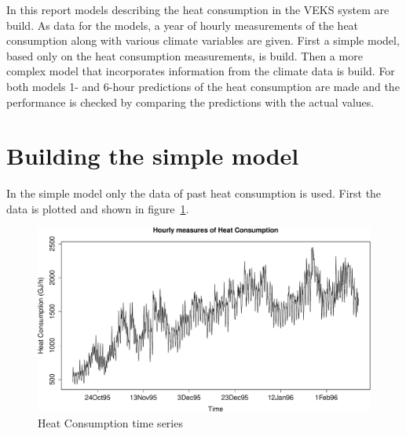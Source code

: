 \def\assignmenttitle{Modelling and Predicting the Heat Consumption}
\def\assignmentnumber{4}
\def\assignmentdate{17-11-2011}
\def\githuburl{\small\url{https://github.com/alphabits/dtu-fall-2011/tree/master/02417/assignment-4}}
\def\githuburlfoot{\footnotesize\url{https://github.com/alphabits/dtu-fall-2011/tree/master/02417/assignment-4}}

\newcommand\mseven{\seasonal{3,1,3}{0,1,1}{24}}
\newcommand\meight{\seasonal{2,1,2}{0,1,1}{24}}
\newcommand\mnine{\seasonal{1,1,1}{0,1,1}{24}}
\newcommand\mten{\seasonal{3,1,2}{0,1,1}{24}}
\newcommand\meleven{\seasonal{2,1,3}{0,1,1}{24}}
\newcommand\mtwentyone{\seasonal{2,1,1}{0,1,1}{24}}
\newcommand\mtwentytwo{\seasonal{2,1,1}{0,1,2}{24}}
\newcommand\mtwentyeight{\seasonal{2,1,1}{1,1,1}{24}}
\newcommand\tfmtwo{\seasonal{2,1,3}{0,1,2}{24}}





\maketitle

In this report models describing the heat consumption in the VEKS system are
build. As data for the models, a year of hourly measurements of the heat
consumption along with various climate variables are given. First a simple
model, based only on the heat consumption measurements, is build. Then a more
complex model that incorporates information from the climate data is build. For
both models 1- and 6-hour predictions of the heat consumption are made and the
performance is checked by comparing the predictions with the actual values.

\section*{Building the simple model}

In the simple model only the data of past heat consumption is used. First the
data is plotted and shown in figure~\ref{fig:hc-ts}.

\begin{figure}[ht]
    \centering
    \includegraphics[width=120mm]{../plots/hc-ts.pdf}
    \caption{Heat Consumption time series}
    \label{fig:hc-ts}
\end{figure}

